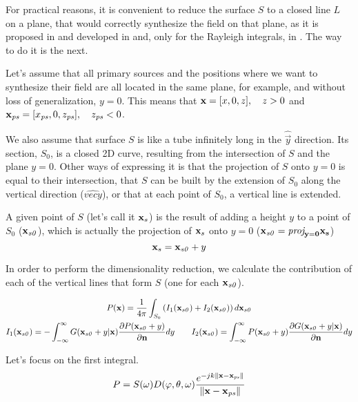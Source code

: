 For practical reasons, it is convenient to reduce the surface $S$ to a closed line $L$ on a plane, that would correctly synthesize the field on that plane, as it is proposed in \cite{Vogel} and developed in \cite{Start1997} and, only for the Rayleigh integrals, in \cite{Verheijen}. The way to do it is the next.

Let's assume that all primary sources and the positions where we want to synthesize their field are all located in the same plane, for example, and without loss of generalization, $y = 0$. This means that $\PosTheo = [x, 0, z],\quad z > 0$ and $\PosTheo[primarySource] = [x_\mathit{ps}, 0, z_\mathit{ps}], \quad z_\mathit{ps} < 0$.

We also assume that surface $S$ is like a tube infinitely long in the $\hat{\vec{y}}$ direction. Its section, $S_0$, is a closed 2D curve, resulting from the intersection of $S$ and the plane $y=0$. Other ways of expressing it is that the projection of $S$ onto $y=0$ is equal to their intersection, that $S$ can be built by the extension of $S_0$ along the vertical direction ($\hat{vec{y}}$), or that at each point of $S_0$, a vertical line is extended.

A given point of $S$ (let's call it $\PosTheo[surface]$) is the result of adding a height $y$ to a point of $S_0$ ($\PosTheo[section]$), which is actually the projection of $\PosTheo[surface]$ onto $y=0$ ($\PosTheo[section] = \vectorproj[y=0]{\PosTheo[surface]}$)
\begin{equation}
\PosTheo[surface] = \PosTheo[section] + y
\end{equation}

In order to perform the dimensionality reduction, we calculate the contribution of each of the vertical lines that form $S$ (one for each $\PosTheo[section]$).

\begin{gather}
	P(\PosTheo) = \frac{1}{4\pi} \int_{S_0} \left( I_{1}(\PosTheo[section]) + I_2(\PosTheo[section]) \right)
	d\PosTheo[section] \\
	I_{1}(\PosTheo[section]) = - \int_{-\infty}^{\infty} G(\PosTheo[section] + y \vert \PosTheo) \frac{\partial P(\PosTheo[section] + y)}{\partial \mathbf{n}} dy \qquad 	I_{2}(\PosTheo[section]) = \int_{-\infty}^{\infty} P(\PosTheo[section] + y)\frac{\partial G(\PosTheo[section] + y\vert \PosTheo)}{\partial \mathbf{n}} dy
\end{gather}

Let's focus on the first integral.
\begin{equation}
P = S(\omega) D(\varphi, \theta, \omega) \GreenFunc[{\PosTheo - \PosTheo[primarySource]}]
\end{equation}

